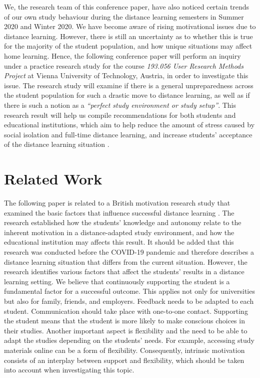 \documentclass{sigchi}
\begin{document}
We, the research team of this conference paper, have also noticed certain trends of our own study behaviour during the distance learning semesters in Summer 2020 and Winter 2020. We have become aware of rising motivational issues due to distance learning. However, there is still an uncertainty as to whether this is true for the majority of the student population, and how unique situations may affect home learning. Hence, the following conference paper will perform an inquiry under a practice research study for the course \textit{193.056 User Research Methods Project} at Vienna University of Technology, Austria, in order to investigate this issue. The research study will examine if there is a general unpreparedness across the student population for such a drastic move to distance learning, as well as if there is such a notion as a \emph{``perfect study environment or study setup''}. This research result will help us compile recommendations for both students and educational institutions, which aim to help reduce the amount of stress caused by social isolation and full-time distance learning, and increase students' acceptance of the distance learning situation \cite{fauci_lane_redfield_2020, hossain_mental_2020}.


\section{Related Work}

The following paper is related to a British motivation research study that examined the basic factors that influence successful distance learning \cite{simons_leverett_beaumont_2019}. The research established how the students' knowledge and autonomy relate to the inherent motivation in a distance-adapted study environment, and how the educational institution may affects this result. It should be added that this research was conducted before the COVID-19 pandemic and therefore describes a distance learning situation that differs from the current situation. However, the research identifies various factors that affect the students' results in a distance learning setting. We believe that continuously supporting the student is a fundamental factor for a successful outcome. This applies not only for universities but also for family, friends, and employers. Feedback needs to be adapted to each student. Communication should take place with one-to-one contact. Supporting the student means that the student is more likely to make conscious choices in their studies. Another important aspect is flexibility and the need to be able to adapt the studies depending on the students' needs. For example, accessing study materials online can be a form of flexibility. Consequently, intrinsic motivation consists of an interplay between support and flexibility, which should be taken into account when investigating this topic.
\end{document}
